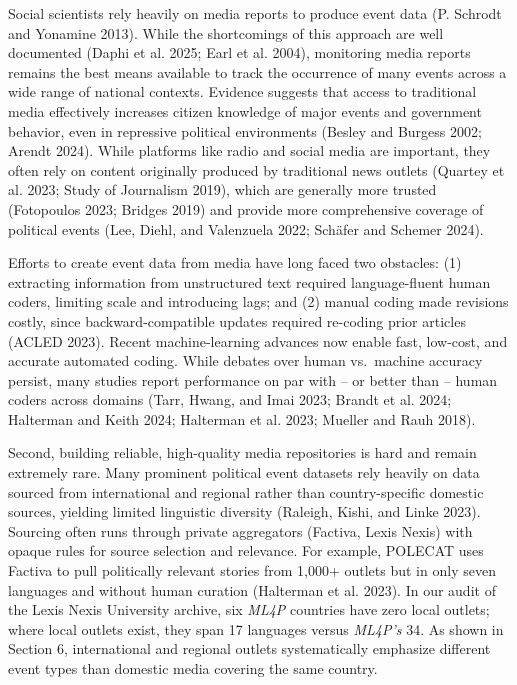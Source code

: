 \documentclass[
  letterpaper,
  DIV=11,
  numbers=noendperiod]{scrartcl}
\begin{document}
Social scientists rely heavily on media reports to produce event data
(P. Schrodt and Yonamine 2013). While the shortcomings of this approach
are well documented (Daphi et al. 2025; Earl et al. 2004), monitoring
media reports remains the best means available to track the occurrence
of many events across a wide range of national contexts. Evidence
suggests that access to traditional media effectively increases citizen
knowledge of major events and government behavior, even in repressive
political environments (Besley and Burgess 2002; Arendt 2024). While
platforms like radio and social media are important, they often rely on
content originally produced by traditional news outlets (Quartey et al.
2023; Study of Journalism 2019), which are generally more trusted
(Fotopoulos 2023; Bridges 2019) and provide more comprehensive coverage
of political events (Lee, Diehl, and Valenzuela 2022; Schäfer and
Schemer 2024).

Efforts to create event data from media have long faced two obstacles:
(1) extracting information from unstructured text required
language-fluent human coders, limiting scale and introducing lags; and
(2) manual coding made revisions costly, since backward-compatible
updates required re-coding prior articles (ACLED 2023). Recent
machine-learning advances now enable fast, low-cost, and accurate
automated coding. While debates over human vs.~machine accuracy persist,
many studies report performance on par with -- or better than -- human
coders across domains (Tarr, Hwang, and Imai 2023; Brandt et al. 2024;
Halterman and Keith 2024; Halterman et al. 2023; Mueller and Rauh 2018).

Second, building reliable, high-quality media repositories is hard and
remain extremely rare. Many prominent political event datasets rely
heavily on data sourced from international and regional rather than
country-specific domestic sources, yielding limited linguistic diversity
(Raleigh, Kishi, and Linke 2023). Sourcing often runs through private
aggregators (Factiva, Lexis Nexis) with opaque rules for source
selection and relevance. For example, POLECAT uses Factiva to pull
politically relevant stories from 1,000+ outlets but in only seven
languages and without human curation (Halterman et al. 2023). In our
audit of the Lexis Nexis University archive, six \emph{ML4P} countries
have zero local outlets; where local outlets exist, they span 17
languages versus \emph{ML4P's} 34. As shown in Section 6, international
and regional outlets systematically emphasize different event types than
domestic media covering the same country.
\end{document}
